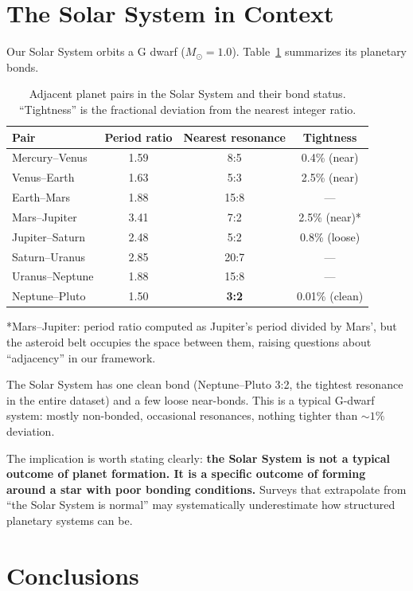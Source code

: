 \documentclass[twocolumn]{aastex631}
\begin{document}
\section{The Solar System in Context}

Our Solar System orbits a G dwarf ($M_\odot = 1.0$). Table~\ref{tab:solarsys}
summarizes its planetary bonds.

\begin{table}
\centering
\caption{Adjacent planet pairs in the Solar System and their bond status.
``Tightness'' is the fractional deviation from the nearest integer ratio.}
\begin{tabular}{lccc}
\hline
Pair & Period ratio & Nearest resonance & Tightness \\
\hline
Mercury--Venus & 1.59 & 8:5 & 0.4\% (near) \\
Venus--Earth   & 1.63 & 5:3 & 2.5\% (near) \\
Earth--Mars    & 1.88 & 15:8 & --- \\
Mars--Jupiter  & 3.41 & 7:2 & 2.5\% (near)* \\
Jupiter--Saturn & 2.48 & 5:2 & 0.8\% (loose) \\
Saturn--Uranus & 2.85 & 20:7 & --- \\
Uranus--Neptune & 1.88 & 15:8 & --- \\
Neptune--Pluto & 1.50 & \textbf{3:2} & 0.01\% (clean) \\
\hline
\end{tabular}
\label{tab:solarsys}
\end{table}

*Mars--Jupiter: period ratio computed as Jupiter's period divided by Mars', but
the asteroid belt occupies the space between them, raising questions about
``adjacency'' in our framework.

The Solar System has one clean bond (Neptune--Pluto 3:2, the tightest
resonance in the entire dataset) and a few loose near-bonds. This is a typical
G-dwarf system: mostly non-bonded, occasional resonances, nothing tighter than
$\sim 1\%$ deviation.

The implication is worth stating clearly: \textbf{the Solar System is not a
typical outcome of planet formation. It is a specific outcome of forming around
a star with poor bonding conditions.} Surveys that extrapolate from ``the
Solar System is normal'' may systematically underestimate how structured
planetary systems can be.

\section{Conclusions}
\label{sec:conclusions}
\end{document}
